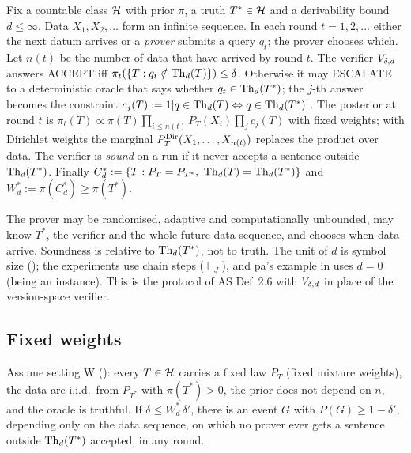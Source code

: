 \begin{definition}\label{def:sound:protocol}
Fix a countable class $\mathcal{H}$ with prior $\pi$, a truth $T^*\in\mathcal{H}$ and a derivability bound $d\le\infty$. Data $X_1,X_2,\dots$ form an infinite sequence. In each round $t=1,2,\dots$ either the next datum arrives or a \emph{prover} submits a query $q_t$; the prover chooses which. Let $n(t)$ be the number of data that have arrived by round $t$. The verifier $V_{\delta,d}$ answers \textsf{ACCEPT} iff $\pi_t(\{T:q_t\notin\mathrm{Th}_d(T)\})\le\delta$. Otherwise it may \textsf{ESCALATE} to a deterministic oracle that says whether $q_t\in\mathrm{Th}_d(T^*)$; the $j$-th answer becomes the constraint $c_j(T):=1[q\in\mathrm{Th}_d(T)\Leftrightarrow q\in\mathrm{Th}_d(T^*)]$. The posterior at round $t$ is $\pi_t(T)\propto\pi(T)\prod_{i\le n(t)}P_T(X_i)\prod_jc_j(T)$ with fixed weights; with Dirichlet weights the marginal $P^{\mathrm{Dir}}_{T}(X_1,\dots,X_{n(t)})$ replaces the product over data. The verifier is \emph{sound} on a run if it never accepts a sentence outside $\mathrm{Th}_d(T^*)$. Finally $C^*_d:=\{T:P_T=P_{T^*},\ \Th_d(T)=\Th_d(T^*)\}$ and $W^*_d:=\pi(C^*_d)\ge\pi(T^*)$.
\end{definition}

The prover may be randomised, adaptive and computationally unbounded, may know $T^*$, the verifier and the whole future data sequence, and chooses when data arrive. Soundness is relative to $\mathrm{Th}_d(T^*)$, not to truth. The unit of $d$ is symbol size (); the experiments use chain steps ($\vdash_J$), and pa's example in  uses $d=0$ (being an instance). This is the protocol of AS Def~2.6 with $V_{\delta,d}$ in place of the version-space verifier.

\subsection{Fixed weights}\label{sec:sound:fixed}

\begin{theorem}\label{thm:sound:fixed}
Assume setting W (): every $T\in\mathcal{H}$ carries a fixed law $P_T$ (fixed mixture weights), the data are i.i.d.\ from $P_{T^*}$ with $\pi(T^*)>0$, the prior does not depend on $n$, and the oracle is truthful. If $\delta\le W^*_d\,\delta'$, there is an event $G$ with $P(G)\ge1-\delta'$, depending only on the data sequence, on which no prover ever gets a sentence outside $\mathrm{Th}_d(T^*)$ accepted, in any round.
\end{theorem}

